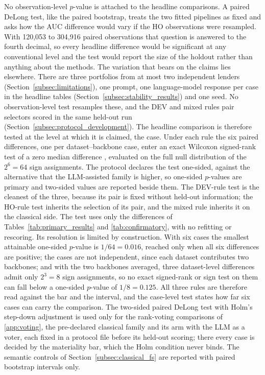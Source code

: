 \documentclass[final,5p,twocolumn]{elsarticle}
\begin{document}
No observation-level $p$-value is attached to the headline comparisons. A paired DeLong test, like the paired bootstrap, treats the two fitted pipelines as fixed and asks how the AUC difference would vary if the HO observations were resampled. With 120,053 to 304,916 paired observations that question is answered to the fourth decimal, so every headline difference would be significant at any conventional level and the test would report the size of the holdout rather than anything about the methods. The variation that bears on the claims lies elsewhere. There are three portfolios from at most two independent lenders (Section~\ref{subsec:limitations}), one prompt, one language-model response per case in the headline tables (Section~\ref{subsec:stability_results}) and one seed. No observation-level test resamples these, and the DEV and mixed rules pair selectors scored in the same held-out run (Section~\ref{subsec:protocol_development}). The headline comparison is therefore tested at the level at which it is claimed, the case. Under each rule the six paired differences, one per dataset--backbone case, enter an exact Wilcoxon signed-rank test of a zero median difference \cite{demsar2006}, evaluated on the full null distribution of the $2^6=64$ sign assignments. The protocol declares the test one-sided, against the alternative that the LLM-assisted family is higher, so one-sided $p$-values are primary and two-sided values are reported beside them. The DEV-rule test is the cleanest of the three, because its pair is fixed without held-out information; the HO-rule test inherits the selection of its pair, and the mixed rule inherits it on the classical side. The test uses only the differences of Tables~\ref{tab:primary_results} and \ref{tab:confirmatory}, with no refitting or rescoring. Its resolution is limited by construction. With six cases the smallest attainable one-sided $p$-value is $1/64=0.016$, reached only when all six differences are positive; the cases are not independent, since each dataset contributes two backbones; and with the two backbones averaged, three dataset-level differences admit only $2^3=8$ sign assignments, so no exact signed-rank or sign test on them can fall below a one-sided $p$-value of $1/8=0.125$. All three rules are therefore read against the bar and the interval, and the case-level test states how far six cases can carry the comparison. The two-sided paired DeLong test \cite{delong1988} with Holm's step-down adjustment \cite{holm1979} is used only for the rank-voting comparisons of \ref{app:voting}, the pre-declared classical family and its arm with the LLM as a voter, each fixed in a protocol file before its held-out scoring; there every case is decided by the materiality bar, which the Holm condition never binds. The semantic controls of Section~\ref{subsec:classical_fs} are reported with paired bootstrap intervals only.
\end{document}

